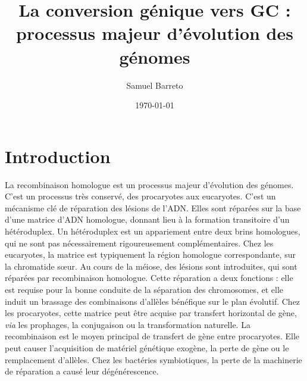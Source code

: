 \documentclass[11pt, oneside]{scrartcl}
\author{Samuel Barreto}
\date{\today}
\title{La conversion génique vers GC : processus majeur d'évolution des génomes}
\begin{document}


\section*{Introduction}
\label{sec:orgheadline1}

La recombinaison homologue est un processus majeur d'évolution des génomes.
C'est un processus très conservé, des procaryotes aux
eucaryotes\cite{cromie_recombination_2001}. C'est un mécanisme clé de réparation
des lésions de l'ADN. Elles sont réparées sur la base d'une matrice d'ADN
homologue, donnant lieu à la formation transitoire d'un hétéroduplex. Un
hétéroduplex est un appariement entre deux brins homologues, qui ne sont pas
nécessairement rigoureusement complémentaires. Chez les eucaryotes, la matrice
est typiquement la région homologue correspondante, sur la chromatide sœur. Au
cours de la méiose, des lésions sont introduites, qui sont réparées par
recombinaison homologue. Cette réparation a deux fonctions : elle est requise
pour la bonne conduite de la séparation des chromosomes, et elle induit un
brassage des combinaisons d'allèles bénéfique sur le plan
évolutif\cite{webster_direct_2012}. Chez les procaryotes, cette matrice peut
être acquise par transfert horizontal de gène, \emph{via} les prophages, la
conjugaison ou la transformation naturelle. La recombinaison est le moyen
principal de transfert de gène entre procaryotes. Elle peut causer l'acquisition
de matériel génétique exogène, la perte de gène ou le remplacement d'allèles.
Chez les bactéries symbiotiques, la perte de la machinerie de réparation a causé
leur dégénérescence\cite{moran_genomics_2008}.  
\end{document}
